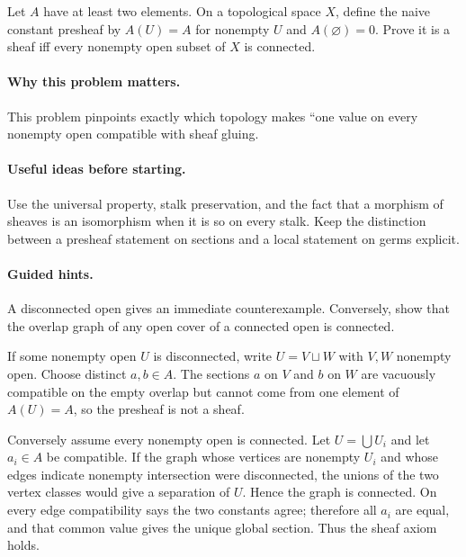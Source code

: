 \begin{problem}
Let $A$ have at least two elements. On a topological space $X$, define the naive constant presheaf by $A(U)=A$ for nonempty $U$ and $A(\varnothing)=0$. Prove it is a sheaf iff every nonempty open subset of $X$ is connected.
\end{problem}

\paragraph{Why this problem matters.}
This problem pinpoints exactly which topology makes ``one value on every nonempty open compatible with sheaf gluing.

\paragraph{Useful ideas before starting.}
Use the universal property, stalk preservation, and the fact that a morphism of sheaves is an isomorphism when it is so on every stalk.  Keep the distinction between a presheaf statement on sections and a local statement on germs explicit.

\paragraph{Guided hints.}
A disconnected open gives an immediate counterexample. Conversely, show that the overlap graph of any open cover of a connected open is connected.

\ifdefined\FullProblemDossiers
\begin{solution}
If some nonempty open $U$ is disconnected, write $U=V\sqcup W$ with $V,W$ nonempty open. Choose distinct $a,b\in A$. The sections $a$ on $V$ and $b$ on $W$ are vacuously compatible on the empty overlap but cannot come from one element of $A(U)=A$, so the presheaf is not a sheaf.

Conversely assume every nonempty open is connected. Let $U=\bigcup U_i$ and let $a_i\in A$ be compatible. If the graph whose vertices are nonempty $U_i$ and whose edges indicate nonempty intersection were disconnected, the unions of the two vertex classes would give a separation of $U$. Hence the graph is connected. On every edge compatibility says the two constants agree; therefore all $a_i$ are equal, and that common value gives the unique global section. Thus the sheaf axiom holds.
\end{solution}


